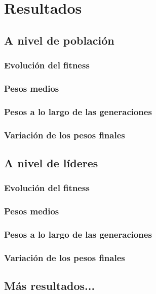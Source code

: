 \chapter{Resultados}

\section{A nivel de población}


\subsection{Evolución del fitness}


\subsection{Pesos medios}


\subsection{Pesos a lo largo de las generaciones}


\subsection{Variación de los pesos finales}


\section{A nivel de líderes}


\subsection{Evolución del fitness}


\subsection{Pesos medios}


\subsection{Pesos a lo largo de las generaciones}


\subsection{Variación de los pesos finales}


\section{Más resultados...}